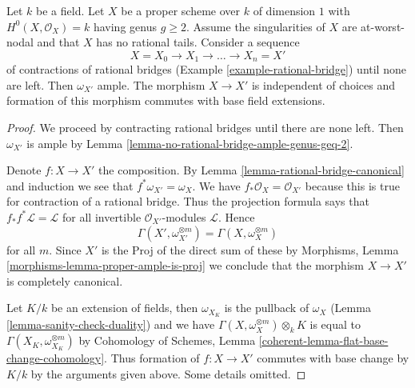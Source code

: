 \begin{lemma}
\label{lemma-contracting-rational-bridges}
Let $k$ be a field. Let $X$ be a proper scheme over $k$ of dimension $1$
with $H^0(X, \mathcal{O}_X) = k$ having genus $g \geq 2$.
Assume the singularities of $X$ are at-worst-nodal and that
$X$ has no rational tails. Consider a sequence
$$
X = X_0 \to X_1 \to \ldots \to X_n = X'
$$
of contractions of rational bridges
(Example \ref{example-rational-bridge}) until none are left.
Then $\omega_{X'}$ ample.
The morphism $X \to X'$ is independent of choices and
formation of this morphism commutes with base field extensions.
\end{lemma}

\begin{proof}
We proceed by contracting rational bridges until there are none
left. Then $\omega_{X'}$ is ample by
Lemma \ref{lemma-no-rational-bridge-ample-genus-geq-2}.

\medskip\noindent
Denote $f : X \to X'$ the composition. By
Lemma \ref{lemma-rational-bridge-canonical} and induction we see that
$f^*\omega_{X'} = \omega_X$.
We have $f_*\mathcal{O}_X = \mathcal{O}_{X'}$
because this is true for contraction of a rational bridge.
Thus the projection formula says that
$f_*f^*\mathcal{L} = \mathcal{L}$ for all invertible
$\mathcal{O}_{X'}$-modules $\mathcal{L}$.
Hence
$$
\Gamma(X', \omega_{X'}^{\otimes m}) = \Gamma(X, \omega_X^{\otimes m})
$$
for all $m$. Since $X'$ is the Proj of the direct sum of these
by Morphisms, Lemma \ref{morphisms-lemma-proper-ample-is-proj}
we conclude that the morphism $X \to X'$ is completely canonical.

\medskip\noindent
Let $K/k$ be an extension of fields, then
$\omega_{X_K}$ is the pullback of $\omega_X$
(Lemma \ref{lemma-sanity-check-duality}) and we have
$\Gamma(X, \omega_X^{\otimes m}) \otimes_k K$
is equal to
$\Gamma(X_K, \omega_{X_K}^{\otimes m})$
by
Cohomology of Schemes, Lemma \ref{coherent-lemma-flat-base-change-cohomology}.
Thus formation of $f : X \to X'$ commutes with base change by
$K/k$ by the arguments given above. Some details omitted.
\end{proof}













